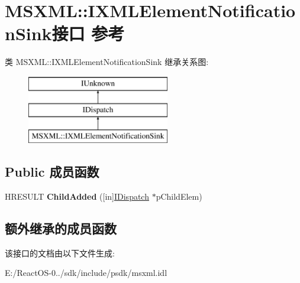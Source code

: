 \hypertarget{interface_m_s_x_m_l_1_1_i_x_m_l_element_notification_sink}{}\section{M\+S\+X\+ML\+:\+:I\+X\+M\+L\+Element\+Notification\+Sink接口 参考}
\label{interface_m_s_x_m_l_1_1_i_x_m_l_element_notification_sink}
类 M\+S\+X\+ML\+:\+:I\+X\+M\+L\+Element\+Notification\+Sink 继承关系图\+:\begin{figure}[H]
\begin{center}
\leavevmode
\includegraphics[height=3.000000cm]{interface_m_s_x_m_l_1_1_i_x_m_l_element_notification_sink}
\end{center}
\end{figure}
\subsection*{Public 成员函数}
\begin{DoxyCompactItemize}
\item 
\mbox{\label{interface_m_s_x_m_l_1_1_i_x_m_l_element_notification_sink_a4b1bd2f01e14294036e37fab4ee8abfc}} 
H\+R\+E\+S\+U\+LT {\bfseries Child\+Added} (\mbox{[}in\mbox{]}\hyperlink{interface_i_dispatch}{I\+Dispatch} $\ast$p\+Child\+Elem)
\end{DoxyCompactItemize}
\subsection*{额外继承的成员函数}


该接口的文档由以下文件生成\+:\begin{DoxyCompactItemize}
\item 
E\+:/\+React\+O\+S-\/0../sdk/include/psdk/msxml.\+idl\end{DoxyCompactItemize}
